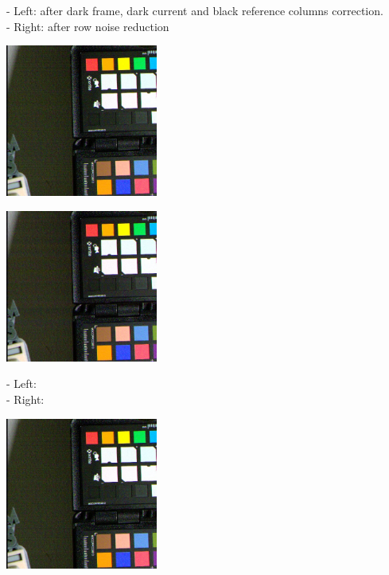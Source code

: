 {- Left: after dark frame, dark current and black reference columns correction.\\
- Right: after row noise reduction  \\

\begin{center}
\includegraphics[height=5cm]{images/10ms+4-crop}
\end{center}

\begin{center}
\includegraphics[height=5cm]{images/10ms+4-fixrn-crop}
\end{center}

- Left:  \\
- Right:  \\

\begin{center}
\includegraphics[height=5cm]{images/10ms+4-rnfilter1-crop}
\end{center}

}
